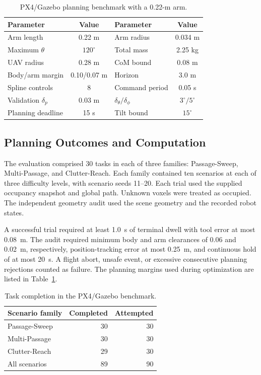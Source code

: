 \documentclass[journal,twoside]{IEEEtran}
\begin{document}
\begin{table}[t]
\centering
\caption{PX4/Gazebo planning benchmark with a 0.22-m arm.}
\label{tab:parameters}
\small
\begin{tabular}{lc@{\quad}lc}
\toprule
Parameter & Value & Parameter & Value\\\midrule
Arm length & 0.22 m & Arm radius & 0.034 m\\
Maximum $\theta$ & $120^\circ$ & Total mass & 2.25 kg\\
UAV radius & 0.28 m & CoM bound & 0.08 m\\
Body/arm margin & 0.10/0.07 m & Horizon & 3.0 m\\
Spline controls & 8 & Command period & 0.05 s\\
Validation $\delta_p$ & 0.03 m & $\delta_\theta/\delta_\phi$ & $3^\circ/5^\circ$\\
Planning deadline & 15 s & Tilt bound & $15^\circ$\\\bottomrule
\end{tabular}
\end{table}


\subsection{Planning Outcomes and Computation}
The evaluation comprised 30 tasks in each of three families: Passage-Sweep, Multi-Passage, and Clutter-Reach. Each family contained ten scenarios at each of three difficulty levels, with scenario seeds 11--20. Each trial used the supplied occupancy snapshot and global path. Unknown voxels were treated as occupied. The independent geometry audit used the scene geometry and the recorded robot states.

A successful trial required at least 1.0~s of terminal dwell with tool error at most 0.08~m. The audit required minimum body and arm clearances of 0.06 and 0.02~m, respectively, position-tracking error at most 0.25~m, and continuous hold of at most 20~s. A flight abort, unsafe event, or excessive consecutive planning rejections counted as failure. The planning margins used during optimization are listed in Table~\ref{tab:parameters}.

\begin{table}[t]
\centering
\caption{Task completion in the PX4/Gazebo benchmark.}
\label{tab:own_planning}
\small
\begin{tabular}{lrr}\toprule
Scenario family & Completed & Attempted\\\midrule
Passage-Sweep & 30 & 30\\
Multi-Passage & 30 & 30\\
Clutter-Reach & 29 & 30\\\midrule
All scenarios & 89 & 90\\\bottomrule
\end{tabular}
\end{table}
\end{document}
